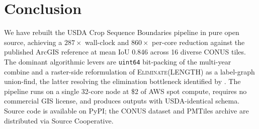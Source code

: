 \documentclass{article}
\begin{document}
\section{Conclusion}

We have rebuilt the USDA Crop Sequence Boundaries pipeline in pure open
source, achieving a $287\times$ wall-clock and $860\times$ per-core
reduction against the published ArcGIS reference at mean IoU 0.846
across 16 diverse CONUS tiles. The dominant algorithmic levers are
\texttt{uint64} bit-packing of the multi-year combine and a raster-side
reformulation of \textsc{Eliminate(LENGTH)} as a label-graph union-find,
the latter resolving the elimination bottleneck identified by
\citet{hunt2024csb}. The pipeline runs on a single 32-core node at
\$2 of AWS spot compute, requires no commercial GIS license, and
produces outputs with USDA-identical schema. Source code is available
on PyPI; the CONUS dataset and PMTiles archive are distributed via
Source Cooperative.



\end{document}
